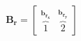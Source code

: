 \documentclass[preview]{standalone}
\begin{document}
\begin{align*}
{\mathbf{B_{r}} = \begin{bmatrix} \overbrace{1}^{\mathbf{b}_{\mathbf{r_x}}}& \overbrace{2}^{\mathbf{b}_{\mathbf{r_y}}} \end{bmatrix}}
\end{align*}
\end{document}
